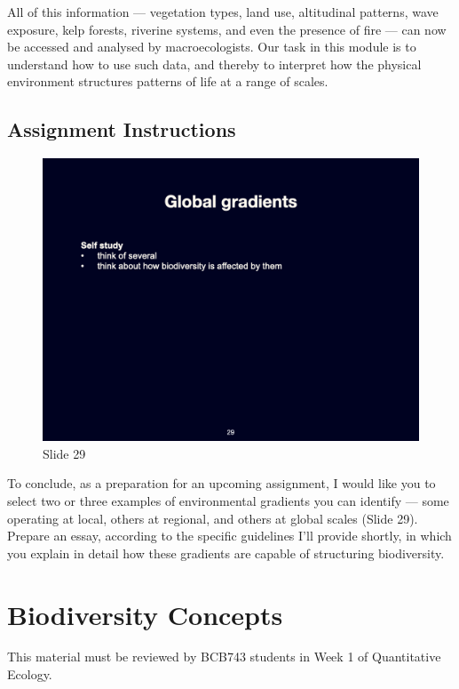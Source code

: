 \documentclass[
  10pt,
]{book}
\begin{document}
All of this information --- vegetation types, land use, altitudinal
patterns, wave exposure, kelp forests, riverine systems, and even the
presence of fire --- can now be accessed and analysed by
macroecologists. Our task in this module is to understand how to use
such data, and thereby to interpret how the physical environment
structures patterns of life at a range of scales.

\section{Assignment Instructions}\label{assignment-instructions}

\begin{figure}[ht]
\centering
\includegraphics[width=0.8\linewidth]{../images/BDC334/BDC334-029.jpeg}
\caption*{Slide 29}
\end{figure}

To conclude, as a preparation for an upcoming assignment, I would like
you to select two or three examples of environmental gradients you can
identify --- some operating at local, others at regional, and others at
global scales (Slide 29). Prepare an essay, according to the specific
guidelines I'll provide shortly, in which you explain in detail how
these gradients are capable of structuring biodiversity.

\chapter{Biodiversity Concepts}\label{biodiversity-concepts}

\begin{tcolorbox}[enhanced jigsaw, leftrule=.75mm, arc=.35mm, title=\textcolor{quarto-callout-note-color}{\faInfo}\hspace{0.5em}{BCB743}, opacityback=0, colframe=quarto-callout-note-color-frame, toprule=.15mm, bottomtitle=1mm, opacitybacktitle=0.6, titlerule=0mm, colback=white, left=2mm, colbacktitle=quarto-callout-note-color!10!white, toptitle=1mm, rightrule=.15mm, breakable, coltitle=black, bottomrule=.15mm]

This material must be reviewed by BCB743 students in Week 1 of
Quantitative Ecology.

\end{tcolorbox}
\end{document}
